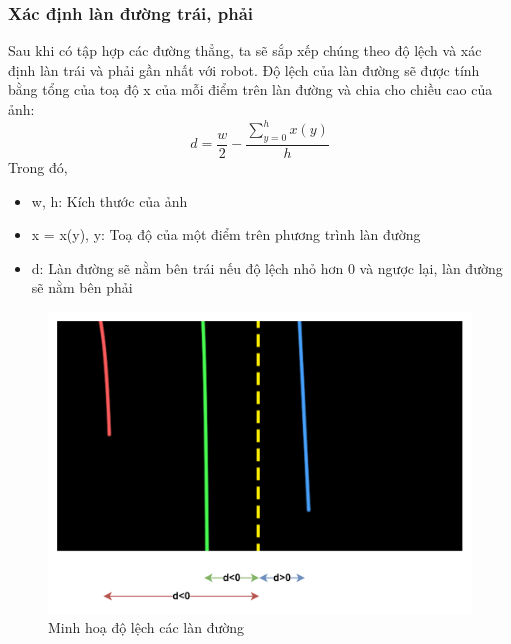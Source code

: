 \subsubsection{Xác định làn đường trái, phải}
Sau khi có tập hợp các đường thẳng, ta sẽ sắp xếp chúng theo độ lệch và xác định làn trái và phải gần nhất với robot. Độ lệch của làn đường sẽ được tính bằng tổng của toạ độ x của mỗi điểm trên làn đường và chia cho chiều cao của ảnh:
\begin{equation}
    d = \frac{w}{2} - \frac{\sum_{y = 0}^{h}x(y)}{h}
\end{equation}
Trong đó,
\begin{itemize}
    \item w, h: Kích thước của ảnh
    \item x = x(y), y: Toạ độ của một điểm trên phương trình làn đường
    \item d: Làn đường sẽ nằm bên trái nếu độ lệch nhỏ hơn 0 và ngược lại, làn đường sẽ nằm bên phải
\end{itemize}
\begin{figure}[!hbt]
\begin{center}
    \includegraphics[width=13cm]{img/4_Implement/lane_tracking/lane_distance.png}
    \caption{Minh hoạ độ lệch các làn đường}
\end{center}
\end{figure}
